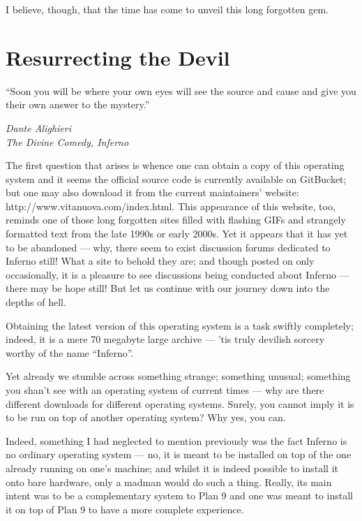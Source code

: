 \documentclass[a5paper,twoside,12pt]{report}
\begin{document}
I believe, though, that the time has come to unveil this long forgotten gem. \newpage

\chapter*{Resurrecting the Devil}

  \epigraph{``Soon you will be where your own eyes will see the source and cause and give you their own answer to the mystery.''}{\textit{Dante Alighieri\\The Divine Comedy, Inferno}}

The first question that arises is whence one can obtain a copy of this operating system and it seems the official source code is currently available on GitBucket; but one may also download it from the current maintainers' website: http://www.vitanuova.com/index.html. This appearance of this website, too, reminds one of those long forgotten sites filled with flashing GIFs and strangely formatted text from the late 1990s or early 2000s. Yet it appears that it has yet to be abandoned — why, there seem to exist discussion forums dedicated to Inferno still! What a site to behold they are; and though posted on only occasionally, it is a pleasure to see discussions being conducted about Inferno — there may be hope still! But let us continue with our journey down into the depths of hell.

Obtaining the latest version of this operating system is a task swiftly completely; indeed, it is a mere 70 megabyte large archive — 'tis truly devilish sorcery worthy of the name  ``Inferno''.

Yet already we stumble across something strange; something unusual; something you shan't see with an operating system of current times — why are there different downloads for different operating systems. Surely, you cannot imply it is to be run on top of another operating system? Why yes, you can.

Indeed, something I had neglected to mention previously was the fact Inferno is no ordinary operating system — no, it is meant to be installed on top of the one already running on one's machine; and whilst it is indeed possible to install it onto bare hardware, only a madman would do such a thing. Really, its main intent was to be a complementary system to Plan 9 and one was meant to install it on top of Plan 9 to have a more complete experience.
\end{document}
